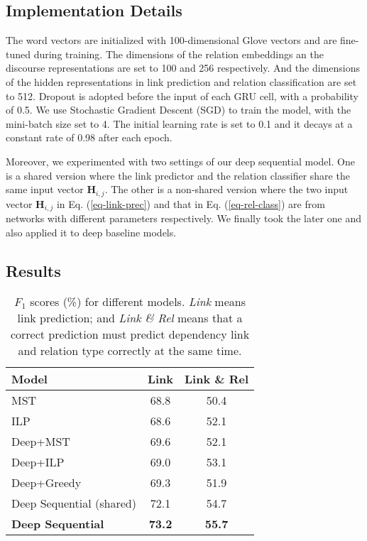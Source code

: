 \documentclass[letterpaper]{article} \usepackage{aaai19}  \usepackage{times}  \usepackage{helvet}  \usepackage{courier}  \usepackage{url}  \usepackage{graphicx}  \usepackage{amssymb}
\begin{document}
\subsection{Implementation Details}

The word vectors are initialized with 100-dimensional Glove vectors \cite{pennington2014glove} and are fine-tuned during training. 
The dimensions of the relation embeddings an the  discourse representations are set to 100 and 256 respectively.
And the dimensions of the hidden representations in link prediction and relation classification are set to 512.
Dropout is adopted before the input of each GRU cell, with a probability of 0.5.
We use Stochastic Gradient Descent (SGD) to train the model, with the mini-batch size set to 4. The initial learning rate is set to 0.1 and it decays at a constant rate of 0.98 after each epoch.

Moreover, we experimented with two settings of our deep sequential model. One is a shared version where the link predictor and the relation classifier share the same input vector $\bm{H}_{i,j}$. The other is a non-shared version where the two input vector $\bm{H}_{i,j}$ in Eq. (\ref{eq-link-prec}) and that in Eq. (\ref{eq-rel-class}) are from networks with different parameters respectively. We finally took the later one and also applied it to deep baseline models.

\subsection{Results}

\begin{table}[ht]
  \centering
  \begin{tabular}{l|c|c}
    \hline
    Model & Link & Link \& Rel\\
    \hline
    MST & 68.8 & 50.4\\ 
    ILP & 68.6 & 52.1\\
    Deep+MST & 69.6 & 52.1 \\
    Deep+ILP & 69.0 & 53.1 \\
    Deep+Greedy & 69.3 & 51.9 \\
    \hline
    Deep Sequential (shared) & 72.1 & 54.7 \\
    \textbf{Deep Sequential} & \textbf{73.2} & \textbf{55.7} \\
    \hline
  \end{tabular}
  \caption{$F_1$ scores (\%) for different models. {\it Link} means link prediction; and {\it Link \& Rel} means that a correct prediction must predict dependency link and relation type correctly at the same time.}
  \label{main_results}
\end{table}
\end{document}
